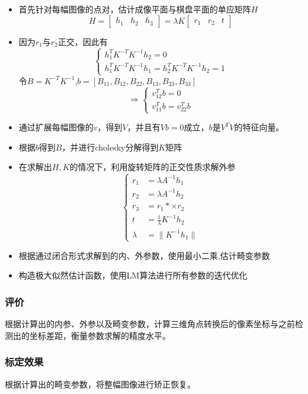 \documentclass[10pt,a4paper]{article}
\begin{document}
\begin{CJK*}{UTF8}{gbsn}
\begin{itemize}
    \item 首先针对每幅图像的点对，估计成像平面与棋盘平面的单应矩阵$H$
     $$
      H =\left[\begin{array}{ccc}h_1&h_2&h_3 \end{array}\right]= \lambda K \left[\begin{array}{ccc}r_1&r_2&t \end{array}\right]
     $$
    \item 因为$r_1$与$r_2$正交，因此有
    $$
    \left\{
    \begin{array}{l}h_1^TK^{-T}K^{-1}h_2 = 0 \\ h_1^TK^{-T}K^{-1}h_1 = h_2^TK^{-T}K^{-1}h_2 = 1\end{array}
    \right. 
    $$
    令$B=K^{-T}K^{-1}$,$b=[B_{11},B_{12},B_{22},B_{13},B_{23},B_{33}]$
    $$
    \Rightarrow 
    \left\{ \begin{array}{l}v_{12}^Tb = 0 \\ v_{11}^Tb = v_{22}^Tb \end{array}\right.
    $$
    \item 通过扩展每幅图像的$v$，得到$V$，并且有$Vb=0$成立，$b$是$V^T V$的特征向量。
    \item 根据$b$得到$B$，并进行cholesky分解得到$K$矩阵
    \item 在求解出$H,K$的情况下，利用旋转矩阵的正交性质求解外参
    $$
    \left\{
    \begin{aligned}
        r_1&=\lambda A^{-1} h_1 \\
        r_2& = \lambda A^{-1} h_2 \\
        r_3 &=r_1*×r_2 \\
        t&=\frac{1}{\lambda} K^{-1} h_2 \\
        \lambda &= \|K^{-1}h_1\|
    \end{aligned}
    \right.
    $$
    \item 根据通过闭合形式求解到的内、外参数，使用最小二乘,估计畸变参数
    \item 构造极大似然估计函数，使用LM算法进行所有参数的迭代优化
\end{itemize}
\subsubsection{评价}
根据计算出的内参、外参以及畸变参数，计算三维角点转换后的像素坐标与之前检测出的坐标差距，衡量参数求解的精度水平。
\subsubsection{标定效果}
根据计算出的畸变参数，将整幅图像进行矫正恢复。


\end{CJK*}
\end{document}
